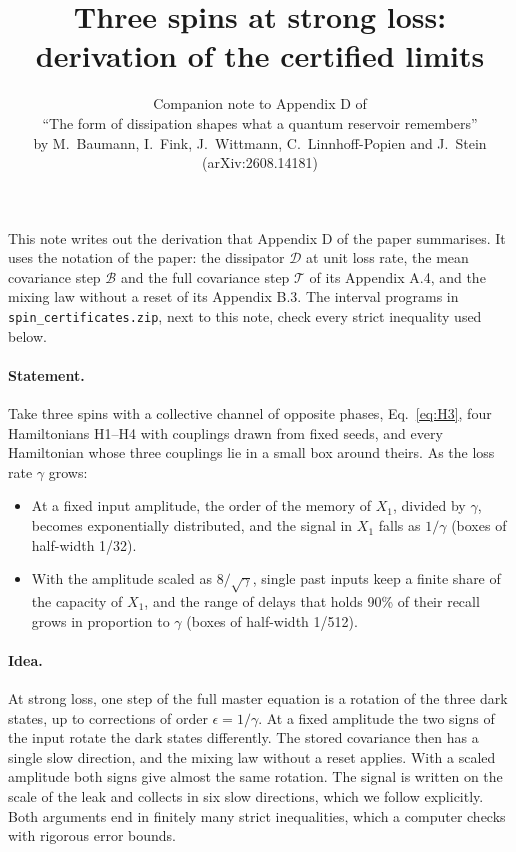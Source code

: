 \documentclass[a4paper,11pt]{article}
\title{Three spins at strong loss:\\derivation of the certified limits}
\author{\normalsize Companion note to Appendix D of\\
\normalsize ``The form of dissipation shapes what a quantum reservoir remembers''\\
\normalsize by M.~Baumann, I.~Fink, J.~Wittmann, C.~Linnhoff-Popien and J.~Stein\\
\normalsize (arXiv:2608.14181)}
\date{}
\begin{document}
\maketitle
\noindent This note writes out the derivation that Appendix D of the paper summarises. It uses the notation of the
paper: the dissipator $\mathcal D$ at unit loss rate, the mean covariance step $\mathcal B$ and the full covariance
step $\mathcal T$ of its Appendix A.4, and the mixing law without a reset of its Appendix B.3. The interval programs in
\texttt{spin\_certificates.zip}, next to this note, check every strict inequality used below.

\paragraph{Statement.}
Take three spins with a collective channel of opposite phases, Eq.~\eqref{eq:H3}, four Hamiltonians H1--H4 with
couplings drawn from fixed seeds, and every Hamiltonian whose three couplings lie in a small box around theirs. As
the loss rate $\gamma$ grows:
\begin{itemize}
\item At a fixed input amplitude, the order of the memory of $X_1$, divided by $\gamma$, becomes exponentially
  distributed, and the signal in $X_1$ falls as $1/\gamma$ (boxes of half-width 1/32).
\item With the amplitude scaled as $8/\sqrt\gamma$, single past inputs keep a finite share of the capacity of $X_1$,
  and the range of delays that holds 90\% of their recall grows in proportion to $\gamma$ (boxes of half-width 1/512).
\end{itemize}

\paragraph{Idea.}
At strong loss, one step of the full master equation is a rotation of the three dark states, up to corrections of
order $\epsilon=1/\gamma$. At a fixed amplitude the two signs of the input rotate the dark states differently. The
stored covariance then has a single slow direction, and the mixing law without a reset applies. With a scaled amplitude
both signs give almost the same rotation. The signal is written on the scale of the leak and collects in six slow
directions, which we follow explicitly. Both arguments end in finitely many strict inequalities, which a computer
checks with rigorous error bounds.
\end{document}
